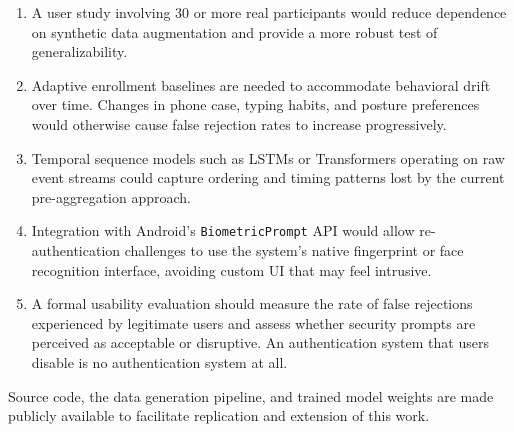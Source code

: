 \documentclass[conference]{IEEEtran}
\begin{document}
\begin{enumerate}
\item A user study involving 30 or more real participants would reduce dependence on synthetic data augmentation and provide a more robust test of generalizability.
\item Adaptive enrollment baselines are needed to accommodate behavioral drift over time. Changes in phone case, typing habits, and posture preferences would otherwise cause false rejection rates to increase progressively.
\item Temporal sequence models such as LSTMs or Transformers operating on raw event streams could capture ordering and timing patterns lost by the current pre-aggregation approach.
\item Integration with Android's \texttt{BiometricPrompt} API would allow re-authentication challenges to use the system's native fingerprint or face recognition interface, avoiding custom UI that may feel intrusive.
\item A formal usability evaluation should measure the rate of false rejections experienced by legitimate users and assess whether security prompts are perceived as acceptable or disruptive. An authentication system that users disable is no authentication system at all.
\end{enumerate}

Source code, the data generation pipeline, and trained model weights are made publicly available to facilitate replication and extension of this work.


\end{document}
